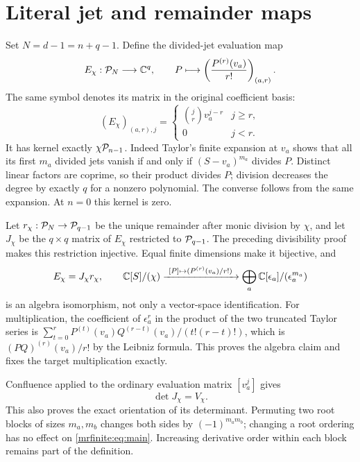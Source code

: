 \documentclass[11pt]{article}
\begin{document}
\section{Literal jet and remainder maps}\label{mrfinite:sec:maps}

Set \(N=d-1=n+q-1\). Define the divided-jet evaluation map
\begin{equation}\label{mrfinite:eq:E}
 E_\chi:\mathcal P_N\longrightarrow\mathbb C^q,
 \qquad P\longmapsto
       \left(\frac{P^{(r)}(v_a)}{r!}\right)_{(a,r)}.
\end{equation}
The same symbol denotes its matrix in the original coefficient basis:
\[
 (E_\chi)_{(a,r),j}=
 \begin{cases}\binom jr v_a^{j-r}&j\geq r,\\0&j<r.\end{cases}
\]
It has kernel exactly \(\chi\mathcal P_{n-1}\). Indeed Taylor's finite
expansion at \(v_a\) shows that all its first \(m_a\) divided jets
vanish if and only if \((S-v_a)^{m_a}\) divides \(P\). Distinct linear
factors are coprime, so their product divides \(P\); division decreases
the degree by exactly \(q\) for a nonzero polynomial. The converse
follows from the same expansion. At \(n=0\) this kernel is zero.

Let \(r_\chi:\mathcal P_N\to\mathcal P_{q-1}\) be the unique remainder after monic
division by \(\chi\), and let \(J_\chi\) be the \(q\times q\) matrix
of \(E_\chi\) restricted to \(\mathcal P_{q-1}\). The preceding divisibility
proof makes this restriction injective. Equal finite dimensions make it
bijective, and
\begin{equation}\label{mrfinite:eq:E-factor}
 E_\chi=J_\chi r_\chi,
 \qquad
 \mathbb C[S]/(\chi)\xrightarrow{\ [P]\mapsto(P^{(r)}(v_a)/r!)\ }
 \bigoplus_a\mathbb C[\epsilon_a]/(\epsilon_a^{m_a})
\end{equation}
is an algebra isomorphism, not only a vector-space identification.
For multiplication, the coefficient of \(\epsilon_a^r\) in the product
of the two truncated Taylor series is
\(\sum_{t=0}^r P^{(t)}(v_a)Q^{(r-t)}(v_a)/(t!(r-t)!)\), which is
\((PQ)^{(r)}(v_a)/r!\) by the Leibniz formula. This proves the algebra
claim and fixes the target multiplication exactly.

Confluence applied to the ordinary evaluation matrix
\([v_a^j]\) gives
\begin{equation}\label{mrfinite:eq:detJ}
 \det J_\chi=V_\chi.
\end{equation}
This also proves the exact orientation of its determinant. Permuting two
root blocks of sizes \(m_a,m_b\) changes both sides by
\((-1)^{m_am_b}\); changing a root ordering has no effect on
\eqref{mrfinite:eq:main}. Increasing derivative order within each block remains
part of the definition.
\end{document}
